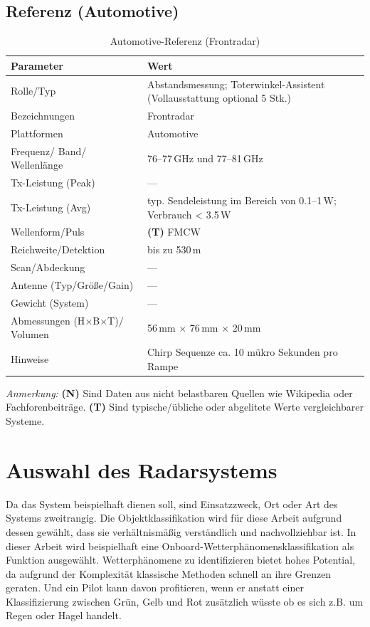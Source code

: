 \subsection{Referenz (Automotive) \parencite{Bosch_FrontRadar_2025}}
\begin{table}[h]
\centering
\renewcommand{\arraystretch}{1.15}
\begin{tabular}{p{3.9cm} p{10.7cm}}
\hline
\textbf{Parameter} & \textbf{Wert} \\
\hline
Rolle/Typ & Abstandsmessung; Toterwinkel-Assistent (Vollausstattung optional 5 Stk.) \\
Bezeichnungen & Frontradar \\
Plattformen & Automotive \\
Frequenz/ Band/ Wellenlänge & 76--77\,GHz und 77--81\,GHz \\
Tx-Leistung (Peak) & --- \\
Tx-Leistung (Avg) & typ. Sendeleistung im Bereich von 0.1--1\,W; Verbrauch < 3.5\,W \\
Wellenform/Puls & \textbf{(T)} FMCW \\
Reichweite/Detektion & bis zu 530\,m \\
Scan/Abdeckung & --- \\
Antenne (Typ/Größe/Gain) & --- \\
Gewicht (System) & --- \\
Abmessungen (H\(\times\)B\(\times\)T)/ Volumen & 56\,mm \(\times\) 76\,mm \(\times\) 20\,mm \\
Hinweise & Chirp Sequenze ca. 10 mükro Sekunden pro Rampe \\
\hline
\end{tabular}
\caption{Automotive-Referenz (Frontradar)}
\end{table}

\emph{Anmerkung:} \textbf{(N)} Sind Daten aus nicht belastbaren Quellen wie Wikipedia oder Fachforenbeiträge. 
\textbf{(T)} Sind typische/übliche oder abgelitete Werte vergleichbarer Systeme.


\section{Auswahl des Radarsystems}
Da das System beispielhaft dienen soll, sind Einsatzzweck, Ort oder Art des Systems zweitrangig. 
Die Objektklassifikation wird für diese Arbeit aufgrund dessen gewählt, dass sie verhältnismäßig verständlich 
und nachvollziehbar ist. In dieser Arbeit wird beispielhaft eine Onboard-Wetterphänomensklassifikation als 
Funktion ausgewählt. Wetterphänomene zu identifizieren bietet hohes Potential, da aufgrund der Komplexität 
klassische Methoden schnell an ihre Grenzen geraten. Und ein Pilot kann davon profitieren, wenn er 
anstatt einer Klassifizierung zwischen Grün, Gelb und Rot zusätzlich wüsste ob es sich z.B. um 
Regen oder Hagel handelt.


